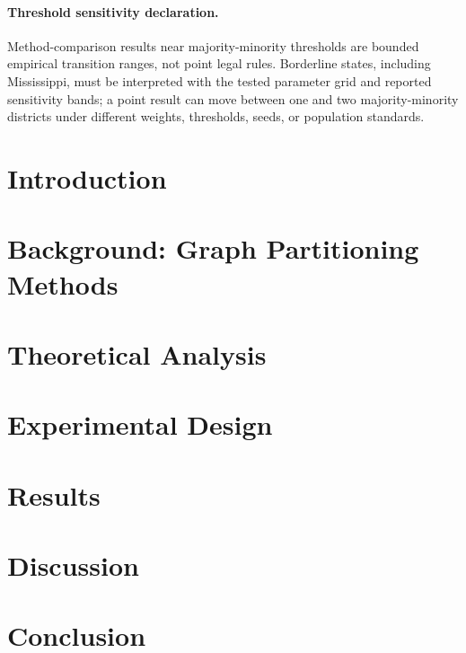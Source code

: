 \documentclass[12pt]{article}
\begin{document}
\paragraph{Threshold sensitivity declaration.} Method-comparison results near majority-minority thresholds are bounded empirical transition ranges, not point legal rules. Borderline states, including Mississippi, must be interpreted with the tested parameter grid and reported sensitivity bands; a point result can move between one and two majority-minority districts under different weights, thresholds, seeds, or population standards.

\section{Introduction}


\section{Background: Graph Partitioning Methods}


\section{Theoretical Analysis}


\section{Experimental Design}


\section{Results}


\section{Discussion}


\section{Conclusion}




\end{document}
